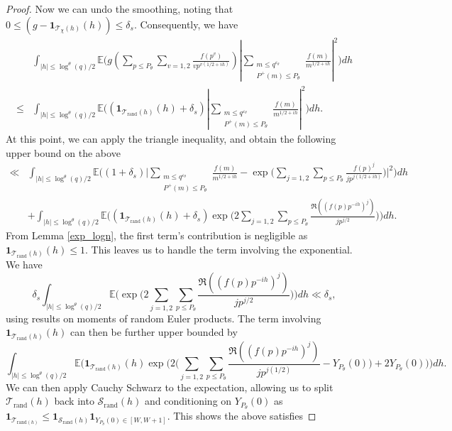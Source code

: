 \documentclass[reqno]{amsart}
\theoremstyle{definition}
\theoremstyle{remark}
\numberwithin{equation}{section}
\theoremstyle{remark}
\begin{document}
\begin{proof}
    Now we can undo the smoothing, noting that $0 \leq (g - \mathbf{1}_{\mathcal{T}_\chi(h)}(h)) \leq \delta_s$. Consequently, we have
    \begin{align*}
        &\int_{|h| \leq \log^{\theta}(q)/2}\mathbb{E}\big(g(\sum_{p \leq P_\theta}\sum_{v=1,2}\frac{f(p^v)}{vp^{v(1/2+ih)}})|\sum_{\substack{m \leq q^{\varepsilon_\theta} \\ P^+(m) \leq P_\theta}}\frac{f(m)}{m^{1/2+ih}}|^2\big)dh \\
        \leq& \int_{|h| \leq \log^{\theta}(q)/2}\mathbb{E}\big((\mathbf{1}_{\mathcal{T}_{\text{rand}}(h)}(h)+\delta_s)|\sum_{\substack{m \leq q^{\varepsilon_\theta} \\ P^+(m) \leq P_\theta}}\frac{f(m)}{m^{1/2+ih}}|^2\big)dh.
    \end{align*}
    At this point, we can apply the triangle inequality, and obtain the following upper bound on the above
    \begin{align*}
        \ll& \int_{|h| \leq \log^\theta(q)/2}\mathbb{E}\big((1+\delta_s)\big|\sum_{\substack{m \leq q^{\varepsilon_\theta} \\ P^+(m) \leq P_\theta}}\frac{f(m)}{m^{1/2+ih}}-\exp\bigg(\sum_{j=1,2}\sum_{p \leq P_\theta}\frac{f(p)^j}{jp^{j(1/2+ih)}}\bigg)\big|^2\big)dh \\
        &+\int_{|h| \leq \log^\theta(q)/2}\mathbb{E}\big((\mathbf{1}_{\mathcal{T}_{\text{rand}}(h)}(h)+\delta_s)\exp\big(2\sum_{j=1,2}\sum_{p \leq P_\theta}\frac{\Re((f(p)p^{-ih})^j)}{jp^{j/2}}\big)\big)dh.
    \end{align*}
    From Lemma \ref{exp_logn}, the first term's contribution is negligible as $\mathbf{1}_{\mathcal{T}_{\text{rand}}(h)}(h) \leq 1$. This leaves us to handle the term involving the exponential. We have $$\delta_s\int_{|h| \leq \log^\theta(q)/2}\mathbb{E}\big(\exp\big(2\sum_{j=1,2}\sum_{p \leq P_\theta}\frac{\Re((f(p)p^{-ih})^j)}{jp^{j/2}}\big)\big)dh\ll \delta_s,$$ using results on moments of random Euler products. The term involving $\mathbf{1}_{\mathcal{T}_{\text{rand}}(h)}(h)$ can then be further upper bounded by
    \begin{equation}
        \int_{|h| \leq \log^\theta(q)/2}\mathbb{E}\big(\mathbf{1}_{\mathcal{T}_{\text{rand}}(h)}(h)\exp\big(2\big(\sum_{j=1,2}\sum_{p \leq P_\theta}\frac{\Re((f(p)p^{-ih})^j)}{jp^{j(1/2)}}-Y_{P_\theta}(0)\big) + 2Y_{P_\theta}(0)\big)\big)dh. \label{final_form}
    \end{equation}
    We can then apply Cauchy Schwarz to the expectation, allowing us to split $\mathcal{T}_{\text{rand}}(h)$ back into $\mathcal{S}_{\text{rand}}(h)$ and conditioning on $Y_{P_\theta}(0)$ as $\mathbf{1}_{\mathcal{T}_{\text{rand}(h)}} \leq \mathbf{1}_{\mathcal{S}_{\text{rand}}(h)}\mathbf{1}_{Y_{P_\theta}(0) \in [W,W+1]}$. This shows the above satisfies

\end{proof}
\end{document}
